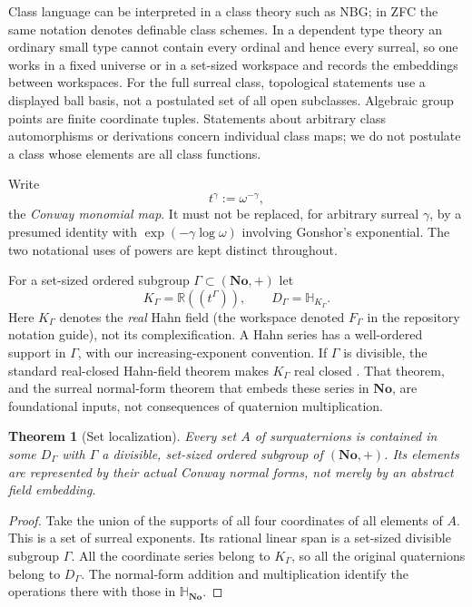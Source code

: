 \documentclass[11pt,letterpaper]{article}
\numberwithin{equation}{section}
\newtheorem{theorem}{Theorem}[section]
\theoremstyle{definition}
\theoremstyle{remark}
\newcommand{\No}{\mathbf{No}}
\newcommand{\SQ}{\mathbb H_{\No}}
\newcommand{\R}{\mathbb R}
\begin{document}
Class language can be interpreted in a class theory such as NBG; in ZFC the same
notation denotes definable class schemes. In a dependent type theory an ordinary small
type cannot contain every ordinal and hence every surreal, so one works in a fixed
universe or in a set-sized workspace and records the embeddings between workspaces. For
the full surreal class, topological statements use a displayed ball basis, not a
postulated set of all open subclasses. Algebraic group points are finite coordinate
tuples. Statements about arbitrary class automorphisms or derivations concern individual
class maps; we do not postulate a class whose elements are all class functions.

Write
\begin{equation}\label{squat:eq:monomial}
 t^\gamma:=\omega^{-\gamma},
\end{equation}
the \emph{Conway monomial map}. It must not be replaced, for arbitrary surreal $\gamma$,
by a presumed identity with $\exp(-\gamma\log\omega)$ involving Gonshor's exponential.
The two notational uses of powers are kept distinct throughout.

For a set-sized ordered subgroup $\Gamma\subset(\No,+)$ let
\[
 K_\Gamma=\R((t^\Gamma)),\qquad D_\Gamma=\mathbb H_{K_\Gamma}.
\]
Here $K_\Gamma$ denotes the \emph{real} Hahn field (the workspace denoted
$F_\Gamma$ in the repository notation guide), not its complexification. A Hahn series
has a well-ordered support in $\Gamma$, with our increasing-exponent convention.
If $\Gamma$ is divisible, the standard real-closed Hahn-field theorem makes
$K_\Gamma$ real closed \cite{Alling,EK}. That theorem, and the surreal normal-form
theorem that embeds these series in $\No$, are foundational inputs, not consequences of
quaternion multiplication.

\begin{theorem}[Set localization]\label{squat:thm:localization}
Every set $A$ of surquaternions is contained in some $D_\Gamma$ with $\Gamma$ a
divisible, set-sized ordered subgroup of $(\No,+)$. Its elements are represented by their
actual Conway normal forms, not merely by an abstract field embedding.
\end{theorem}
\begin{proof}
Take the union of the supports of all four coordinates of all elements of $A$. This is a
set of surreal exponents. Its rational linear span is a set-sized divisible subgroup
$\Gamma$. All the coordinate series belong to $K_\Gamma$, so all the original
quaternions belong to $D_\Gamma$. The normal-form addition and multiplication identify
the operations there with those in $\SQ$.
\end{proof}
\end{document}
